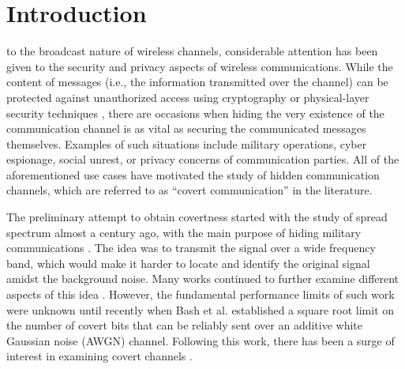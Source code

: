 \section{Introduction}
% 
% 
% 
% 
 to the broadcast nature of wireless channels, considerable attention has been given to the security and privacy aspects of wireless communications. While the content of messages (i.e., the information transmitted over the channel) can be protected against unauthorized access using cryptography or physical-layer security techniques \cite{zhou2013physical}, there are occasions when hiding the very existence of the communication channel is as vital as securing the communicated messages themselves. Examples of such situations include military operations, cyber espionage, social unrest, or privacy concerns of communication parties. All of the aforementioned use cases have motivated the study of hidden communication channels, which are referred to as ``covert communication'' \cite{lampson1973note, bloch2016covert} in the literature.

The preliminary attempt to obtain covertness started with the study of spread spectrum almost a century ago, with the main purpose of hiding military communications \cite{scholtz1982origins}. The idea was to transmit the signal over a wide frequency band, which would make it harder to locate and identify the original signal amidst the background noise. Many works continued to further examine different aspects of this idea \cite{reynders2016chirp, yan2019low}. However, the fundamental performance limits of such work were unknown until recently when Bash et al. \cite{bash2013limits} established a square root limit on the number of covert bits that can be reliably sent over an additive white Gaussian noise (AWGN) channel. Following this work, there has been a surge of interest in examining covert channels \cite{sobers2017covert,soltani2018covert,sheikholeslami2018multi,cao2018wireless}.

